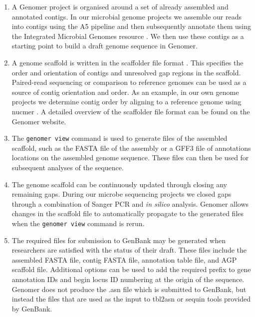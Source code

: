 \documentclass[10pt]{article}
\begin{document}
\begin{enumerate}

  \item{A Genomer project is organised around a set of already assembled and
  annotated contigs. In our microbial genome projects we assemble our reads
  into contigs using the A5 pipeline \cite{tritt2012} and then subsequently
  annotate them using the Integrated Microbial Genomes resource
  \cite{markowitz2006}. We then use these contigs as a starting point to build
  a draft genome sequence in Genomer.}

  \item{A genome scaffold is written in the scaffolder file format
  \cite{barton2012}. This specifies the order and orientation of contigs and
  unresolved gap regions in the scaffold. Paired-read sequencing or comparison
  to reference genomes can be used as a source of contig orientation and order.
  As an example, in our own genome projects we determine contig order by
  aligning to a reference genome using nucmer \cite{kurtz2004}. A detailed
  overview of the scaffolder file format can be found on the Genomer website.}

  \item{The \verb+genomer view+ command is used to generate files of the
  assembled scaffold, such as the FASTA file of the assembly or a GFF3 file of
  annotations locations on the assembled genome sequence. These files can then
  be used for subsequent analyses of the sequence.}

  \item{The genome scaffold can be continuously updated through closing any
  remaining gaps. During our microbe sequencing projects we closed gaps through
  a combination of Sanger PCR and \emph{in silico} analysis. Genomer allows
  changes in the scaffold file to automatically propagate to the generated
  files when the \verb+genomer view+ command is rerun.}

  \item{The required files for submission to GenBank may be generated when
  researchers are satisfied with the status of their draft. These files include
  the assembled FASTA file, contig FASTA file, annotation table file, and AGP
  scaffold file. Additional options can be used to add the required prefix to
  gene annotation IDs and begin locus ID numbering at the origin of the
  sequence. Genomer does not produce the .asn file which is submitted to
  GenBank, but instead the files that are used as the input to tbl2asn or
  sequin tools provided by GenBank.}

\end{enumerate}
\end{document}
